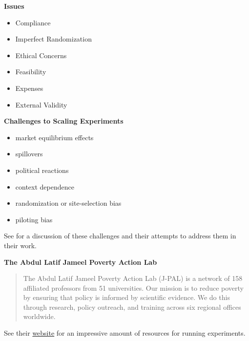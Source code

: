 \begin{frame}\textbf{Issues}\vspace{0.3cm}

\begin{itemize}\setlength\itemsep{0.5em}
\item Compliance
\item Imperfect Randomization
\item Ethical Concerns
\item Feasibility
\item Expenses
\item External Validity
\end{itemize}
\end{frame}
\begin{frame}\textbf{Challenges to Scaling Experiments}\vspace{0.3cm}

\begin{itemize}\setlength\itemsep{0.5em}
\item market equilibrium effects
\item spillovers
\item political reactions
\item context dependence
\item randomization or site-selection bias
\item piloting bias\vspace{0.3cm}
\end{itemize}

See \citet{Banerjee.2017} for a discussion of these challenges and their attempts to address them in their work.
\end{frame}
\begin{frame}\textbf{The Abdul Latif Jameel Poverty Action Lab}\vspace{0.3cm}

\begin{quote} The Abdul Latif Jameel Poverty Action Lab (J-PAL) is a network of 158 affiliated professors from 51 universities. Our mission is to reduce poverty by ensuring that policy is informed by scientific evidence. We do this through research, policy outreach, and training across six regional offices worldwide.\\\vspace{0.3cm}
\end{quote}


See their \href{https://www.povertyactionlab.org}{website} for an impressive amount of resources for running experiments.
\end{frame}
